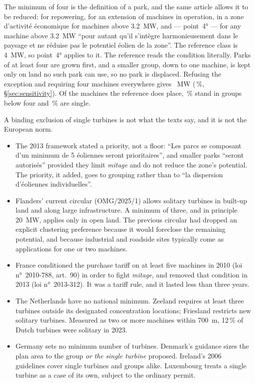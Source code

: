 \documentclass[11pt,a4paper]{article}
\begin{document}
The minimum of four is the definition of a park, and the same article allows it
to be reduced: for repowering, for an extension of machines in operation, in a
zone d'activité économique for machines above \SI{3.2}{\mega\watt}, and ---
point~4° --- for any machine above \SI{3.2}{\mega\watt} ``pour autant qu'il
s'intègre harmonieusement dans le paysage et ne réduise pas le potentiel éolien
de la zone''. The reference class is \SI{4}{\mega\watt}, so point~4° applies to
it. The reference reads the condition literally. Parks of at least four are
grown first, and a smaller group, down to one machine, is kept only on land no
such park can use, so no park is displaced. Refusing the exception and requiring
four machines everywhere gives \SensParksFourMW{}~MW
(\SensParksFourPct{}\,\%, §\ref{sec:sensitivity}). Of the machines the reference
does place, \PlaceSmallShare{}\,\% stand in groups below four and
\PlaceSingleShare{}\,\% are single.

A binding exclusion of single turbines is not what the texts say, and it is not
the European norm.

\begin{itemize}
  \item The 2013 framework stated a priority, not a floor: ``Les parcs se
    composant d'un minimum de 5 éoliennes seront prioritaires'', and smaller
    parks ``seront autorisés'' provided they limit \emph{mitage} and do not
    reduce the zone's potential. The priority, it added, goes to grouping
    rather than to ``la dispersion d'éoliennes individuelles''.
  \item Flanders' current circular (OMG/2025/1) allows solitary turbines in
    built-up land and along large infrastructure. A minimum of three, and in
    principle \SI{20}{\mega\watt}, applies only in open land. The previous
    circular had dropped an explicit clustering preference because it would
    foreclose the remaining potential, and because industrial and roadside
    sites typically come as applications for one or two machines.
  \item France conditioned the purchase tariff on at least five machines in
    2010 (loi n°~2010-788, art.~90) in order to fight \emph{mitage}, and
    removed that condition in 2013 (loi n°~2013-312). It was a tariff rule, and
    it lasted less than three years.
  \item The Netherlands have no national minimum. Zeeland requires at least
    three turbines outside its designated concentration locations; Friesland
    restricts new solitary turbines. Measured as two or more machines within
    \SI{700}{\metre}, 12\,\% of Dutch turbines were solitary in 2023.
  \item Germany sets no minimum number of turbines. Denmark's guidance sizes
    the plan area to the group \emph{or the single turbine} proposed. Ireland's
    2006 guidelines cover single turbines and groups alike. Luxembourg treats a
    single turbine as a case of its own, subject to the ordinary permit.
\end{itemize}
\end{document}

